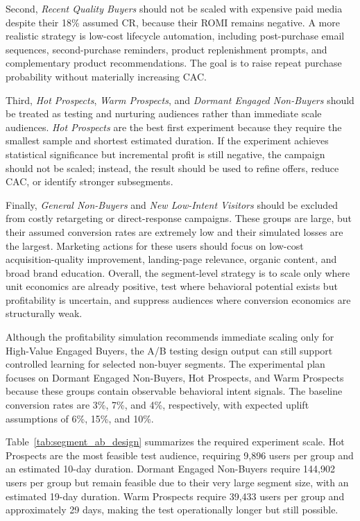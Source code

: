 \documentclass[conference]{IEEEtran}
\begin{document}
Second, \textit{Recent Quality Buyers} should not be scaled with expensive paid media despite their 18\% assumed CR, because their ROMI remains negative. A more realistic strategy is low-cost lifecycle automation, including post-purchase email sequences, second-purchase reminders, product replenishment prompts, and complementary product recommendations. The goal is to raise repeat purchase probability without materially increasing CAC.

Third, \textit{Hot Prospects}, \textit{Warm Prospects}, and \textit{Dormant Engaged Non-Buyers} should be treated as testing and nurturing audiences rather than immediate scale audiences. \textit{Hot Prospects} are the best first experiment because they require the smallest sample and shortest estimated duration. If the experiment achieves statistical significance but incremental profit is still negative, the campaign should not be scaled; instead, the result should be used to refine offers, reduce CAC, or identify stronger subsegments.

Finally, \textit{General Non-Buyers} and \textit{New Low-Intent Visitors} should be excluded from costly retargeting or direct-response campaigns. These groups are large, but their assumed conversion rates are extremely low and their simulated losses are the largest. Marketing actions for these users should focus on low-cost acquisition-quality improvement, landing-page relevance, organic content, and broad brand education. Overall, the segment-level strategy is to scale only where unit economics are already positive, test where behavioral potential exists but profitability is uncertain, and suppress audiences where conversion economics are structurally weak.

Although the profitability simulation recommends immediate scaling only for High-Value Engaged Buyers, the A/B testing design output can still support controlled learning for selected non-buyer segments. The experimental plan focuses on Dormant Engaged Non-Buyers, Hot Prospects, and Warm Prospects because these groups contain observable behavioral intent signals. The baseline conversion rates are 3\%, 7\%, and 4\%, respectively, with expected uplift assumptions of 6\%, 15\%, and 10\%.

Table~\ref{tab:segment_ab_design} summarizes the required experiment scale. Hot Prospects are the most feasible test audience, requiring 9,896 users per group and an estimated 10-day duration. Dormant Engaged Non-Buyers require 144,902 users per group but remain feasible due to their very large segment size, with an estimated 19-day duration. Warm Prospects require 39,433 users per group and approximately 29 days, making the test operationally longer but still possible.
\end{document}
